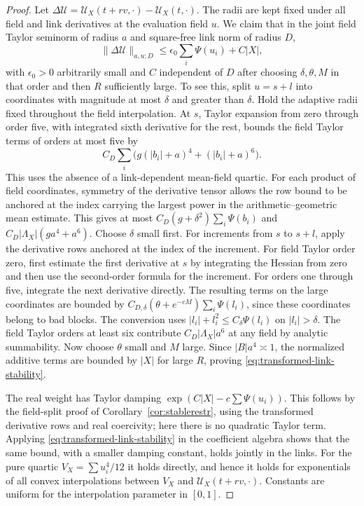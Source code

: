 \documentclass[11pt]{article}
\begin{document}
\begin{proof}
Let \(\Delta\mathcal U=\mathcal U_X(t+rv,\cdot)-\mathcal U_X(t,\cdot)\).
The radii are kept fixed under all field and link derivatives at
the evaluation field \(u\).
We claim that in the joint field Taylor seminorm of radius \(a\)
and square-free link norm of radius \(D\),
\begin{equation}\label{eq:transformed-link-stability}
 \|\Delta\mathcal U\|_{a,u;D}
       \le \epsilon_0\sum_i\Psi(u_i)+C|X|,
\end{equation}
with \(\epsilon_0>0\) arbitrarily small and \(C\) independent of
\(D\) after choosing \(\delta,\theta,M\) in that order and then
\(R\) sufficiently large. To see this, split \(u=s+l\) into
coordinates with magnitude at most \(\delta\) and greater than
\(\delta\). Hold the adaptive radii fixed throughout the field
interpolation. At \(s\), Taylor expansion from zero through
order five, with integrated sixth derivative for the rest,
bounds the field Taylor terms of orders at most five by
\[
 C_D\sum_i\bigl(g(|b_i|+a)^4+(|b_i|+a)^6\bigr).
\]
This uses the absence of a link-dependent mean-field quartic.
For each product of field coordinates, symmetry of the
derivative tensor allows the row bound to be anchored at the
index carrying the largest power in the arithmetic--geometric
mean estimate. This gives at most
\(C_D(g+\delta^2)\sum_i\Psi(b_i)\) and
\(C_D|\Lambda_X|(ga^4+a^6)\). Choose \(\delta\) small first.
For increments from \(s\) to \(s+l\), apply the derivative rows
anchored at the index of the increment. For field Taylor order
zero, first estimate the first derivative at \(s\) by integrating
the Hessian from zero and then use the second-order formula for
the increment. For orders one through five, integrate the next
derivative directly. The resulting terms on the large coordinates
are bounded by \(C_{D,\delta}(\theta+e^{-cM})\sum_i\Psi(l_i)\),
since these coordinates belong to bad blocks. The conversion
uses \(|l_i|+l_i^2\le C_\delta\Psi(l_i)\) on \(|l_i|>\delta\).
The field Taylor orders at least six contribute
\(C_D|\Lambda_X|a^6\) at any field by analytic summability.
Now choose \(\theta\) small and \(M\) large. Since
\(|B|a^4\asymp1\), the normalized additive terms are bounded by
\(|X|\) for large \(R\), proving \eqref{eq:transformed-link-stability}.

The real weight has Taylor damping
\(\exp(C|X|-c\sum\Psi(u_i))\). This follows by the field-split
proof of Corollary~\ref{cor:stablerestr}, using the transformed
derivative rows and real coercivity; here there is no quadratic
Taylor term. Applying \eqref{eq:transformed-link-stability} in
the coefficient algebra shows that the same bound, with a
smaller damping constant, holds jointly in the links. For the
pure quartic \(V_X=\sum u_i^4/12\) it holds directly, and hence
it holds for exponentials of all convex interpolations between
\(V_X\) and \(\mathcal U_X(t+rv,\cdot)\). Constants are uniform
for the interpolation parameter in \([0,1]\).


\end{proof}
\end{document}
